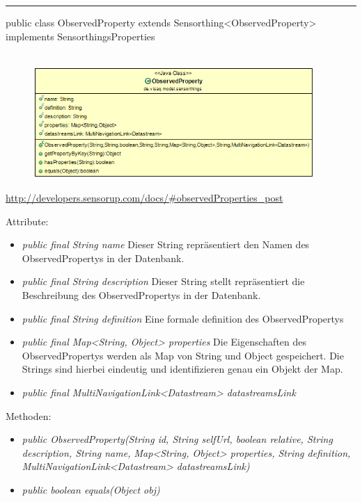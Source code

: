 \rule{\textwidth}{0.4pt}
public class ObservedProperty extends Sensorthing<ObservedProperty> implements SensorthingsProperties
\\\\
\begin{minipage}{0.4\textwidth}
    \begin{figure}[H]
        {\centering\includegraphics[width=0.95\textwidth]{media/backend/modell/classes/ObservedProperty.png}}
    \end{figure}
    \end{minipage} \hfill
\begin{minipage}{0.6\textwidth}
    \url{http://developers.sensorup.com/docs/#observedProperties_post}
\end{minipage}

Attribute:
\begin{itemize}
    \item \emph{public final String name} Dieser String repräsentiert den Namen des ObservedPropertys in der Datenbank.
    \item \emph{public final String description} Dieser String stellt repräsentiert die Beschreibung des ObservedPropertys in der Datenbank.
    \item \emph{public final String definition} Eine formale definition des ObservedPropertys 
    \item \emph{public final Map<String, Object> properties} Die Eigenschaften des ObservedPropertys werden als Map von String und Object gespeichert. Die Strings sind hierbei eindeutig und identifizieren genau ein Objekt der Map.
    \item \emph{public final MultiNavigationLink<Datastream> datastreamsLink} 
\end{itemize}
Methoden:
\begin{itemize}
    \item \emph{public ObservedProperty(String id, String selfUrl, boolean relative, String description, String name, Map<String, Object> properties, String definition, MultiNavigationLink<Datastream> datastreamsLink)}
    \item \emph{public boolean equals(Object obj)} 
\end{itemize}

